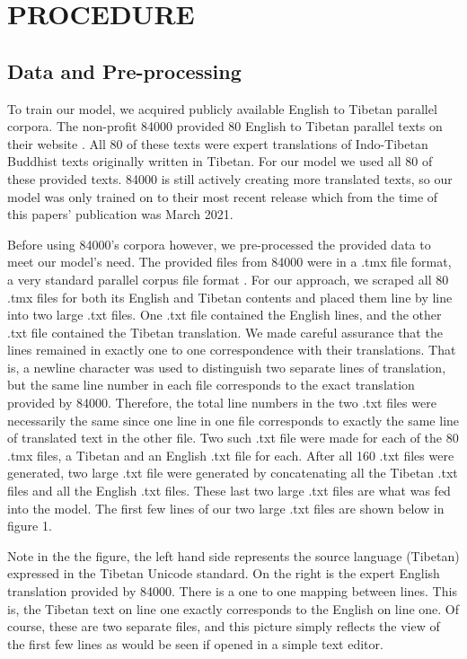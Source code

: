 \documentclass[letterpaper, 12 pt, conference]{ieeeconf}  %
\begin{document}
\section{PROCEDURE}


\subsection{Data and Pre-processing}

To train our model, we acquired publicly available English to Tibetan parallel corpora. The non-profit 84000 provided 80 English to Tibetan parallel texts on their website \cite{c8}. All 80 of these texts were expert translations of Indo-Tibetan Buddhist texts originally written in Tibetan. For our model we used all 80 of these provided texts. 84000 is still actively creating more translated texts, so our model was only trained on to their most recent release which from the time of this papers' publication was March 2021.

Before using 84000's corpora however, we pre-processed the provided data to meet our model's need. The provided files from 84000 were in a .tmx file format, a very standard parallel corpus file format \cite{c9}. 
For our approach, we scraped all 80 .tmx files for both its English and Tibetan contents and placed them line by line into two large .txt files. One .txt file contained the English lines, and the other .txt file contained the Tibetan translation. We made careful assurance that the lines remained in exactly one to one correspondence with their translations. That is, a newline character was used to distinguish two separate lines of translation, but the same line number in each file corresponds to the exact translation provided by 84000. Therefore, the total line numbers in the two .txt files were necessarily the same since one line in one file corresponds to exactly the same line of translated text in the other file. Two such .txt file were made for each of the 80 .tmx files, a Tibetan and an English .txt file for each. After all 160 .txt files were generated, two large .txt file were generated by concatenating all the Tibetan .txt files and all the English .txt files. These last two large .txt files are what was fed into the model. The first few lines of our two large .txt files are shown below in figure 1.

Note in the the figure, the left hand side represents the source language (Tibetan) expressed in the Tibetan Unicode standard. On the right is the expert English translation provided by 84000. There is a one to one mapping between lines. This is, the Tibetan text on line one exactly corresponds to the English on line one. Of course, these are two separate files, and this picture simply reflects the view of the first few lines as would be seen if opened in a simple text editor. 
\end{document}
